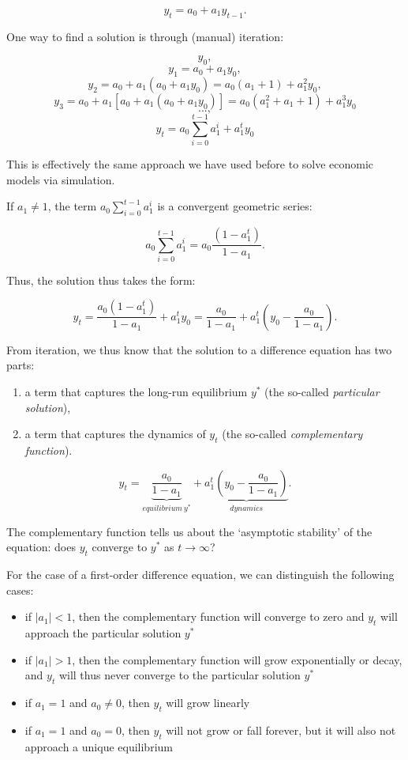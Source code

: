 \documentclass[
  letterpaper,
  DIV=11,
  numbers=noendperiod]{scrreprt}
\providecommand{\tightlist}{%
  \setlength{\itemsep}{0pt}\setlength{\parskip}{0pt}}\usepackage{longtable,booktabs,array}
\begin{document}
\[
y_t = a_0 + a_1y_{t-1}.
\]

One way to find a solution is through (manual) iteration:

\[y_0,\] \[y_1 = a_0 + a_1 y_0,\]
\[y_2 = a_0 + a_1(a_0 + a_1 y_0) = a_0(a_1+1) + a_1^2y_0 ,\]
\[y_3 = a_0 + a_1[a_0 + a_1(a_0 +a_1y_0)]= a_0(a_1^2+a_1+1) + a_1^3y_0\]
\[...,\] \[y_t = a_0\sum^{t-1}_{i=0} a_1^i + a_1^ty_0 \]

This is effectively the same approach we have used before to solve
economic models via simulation.

If \(a_1\neq1\), the term \(a_0\sum^{t-1}_{i=0} a_1^i\) is a convergent
geometric series:

\[a_0\sum^{t-1}_{i=0} a_1^i= a_0\frac{(1-a_1^t)}{1-a_1}.\]

Thus, the solution thus takes the form:

\[
y_t = \frac{a_0(1-a_1^t)}{1-a_1} + a_1^ty_0 =\frac{a_0}{1-a_1} + a_1^t\left(y_0 - \frac{a_0}{1-a_1}\right).
\]

From iteration, we thus know that the solution to a difference equation
has two parts:

\begin{enumerate}
\def\labelenumi{\arabic{enumi}.}
\tightlist
\item
  a term that captures the long-run equilibrium \(y^*\) (the so-called
  \emph{particular solution}),
\item
  a term that captures the dynamics of \(y_t\) (the so-called
  \emph{complementary function}).
\end{enumerate}

\[
y_t = \underbrace{\frac{a_0}{1-a_1}}_{equilibrium \: y^*} + \underbrace{a_1^t\left(y_0 - \frac{a_0}{1-a_1}\right)}_{dynamics}.
\]

The complementary function tells us about the `asymptotic stability' of
the equation: does \(y_t\) converge to \(y^*\) as
\(t \rightarrow \infty\)?

For the case of a first-order difference equation, we can distinguish
the following cases:

\begin{itemize}
\item
  if \(|a_1|<1\), then the complementary function will converge to zero
  and \(y_t\) will approach the particular solution \(y^*\)
\item
  if \(|a_1|>1\), then the complementary function will grow
  exponentially or decay, and \(y_t\) will thus never converge to the
  particular solution \(y^*\)
\item
  if \(a_1=1\) and \(a_0 \neq0\), then \(y_t\) will grow linearly
\item
  if \(a_1=1\) and \(a_0 =0\), then \(y_t\) will not grow or fall
  forever, but it will also not approach a unique equilibrium
\end{itemize}
\end{document}
